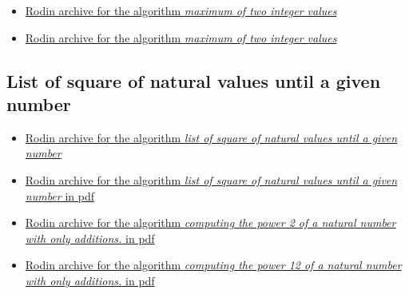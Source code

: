 \documentclass[ 12pt]{article}
\begin{document}
\begin{itemize}
\item[] 
  \href{https://mery54.github.io/mery/eventb/ex4.zip}{Rodin archive 
    for the algorithm \textit{ maximum of two integer values}}

\item[] 
  \href{https://mery54.github.io/mery/eventb/ex4.pdf}{Rodin archive 
    for the algorithm \textit{ maximum of two integer values}}  

    
\end{itemize}



\subsection{List of square of  natural values until a given number}
\label{sec:comp-sum-elem}


\begin{itemize}
\item[] 
  \href{https://mery54.github.io/mery/eventb/ex7-1.zip}{Rodin archive 
    for  the algorithm \textit{list of square of  natural values 
      until a given number}}

\item[] 
  \href{https://mery54.github.io/mery/eventb/ex7-1.pdf}{Rodin archive 
    for  the algorithm \textit{list of square of  natural values 
      until a given number} in pdf}  

 \item[] 
  \href{https://mery54.github.io/mery/eventb/ex7-2.zip}{Rodin archive 
    for  the algorithm \textit{computing  the power 2 of a natural 
      number with only additions.} in pdf}

 \item[] 
  \href{https://mery54.github.io/mery/eventb/ex7-2.pdf}{Rodin archive 
    for  the algorithm \textit{computing  the power 12 of a natural 
      number with only additions.} in pdf} 
 
\end{itemize}
\end{document}
